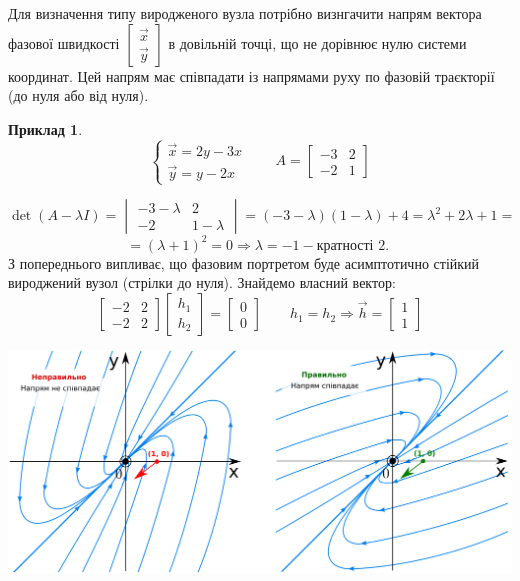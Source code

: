 \documentclass[14pt,a4paper]{scrartcl}
\theoremstyle{definition}
\newtheorem*{example}{Приклад}
\theoremstyle{definition}
\theoremstyle{definition}
\begin{document}
Для визначення типу виродженого вузла потрібно визнгачити напрям вектора фазової швидкості $ \begin{bmatrix}
 \overrightarrow{x} \\
 \overrightarrow{y}
\end{bmatrix}$ в довільній точці, що не дорівнює нулю системи координат. Цей напрям має співпадати із напрямами руху по фазовій траєкторії (до нуля або від нуля).

\begin{example}
    $$
    \begin{cases}
        \overrightarrow{x} = 2y - 3x\\
        \overrightarrow{y} = y - 2x
    \end{cases} \qquad A = \begin{bmatrix}
     -3 & 2 \\
     -2 & 1
    \end{bmatrix}
    $$

    $$
    \det{ \left( A - \lambda I  \right) } = \begin{vmatrix}
      -3 - \lambda & 2 \\
      -2 & 1 - \lambda
    \end{vmatrix} = ( -3 - \lambda ) ( 1 -\lambda) + 4 =  \lambda^2 + 2 \lambda + 1 =
    $$
    $$
    = ( \lambda+ 1) ^2 = 0 \Longrightarrow  \lambda = -1 - \text{кратності 2. }
    $$
З попереднього випливає, що фазовим портретом буде асимптотично стійкий вироджений вузол (стрілки до нуля).
Знайдемо власний вектор:
$$
\begin{bmatrix}
 -2 & 2 \\
 -2 & 2
\end{bmatrix} \begin{bmatrix}
 h_1 \\
 h_2
\end{bmatrix} = \begin{bmatrix}
 0 \\
 0
\end{bmatrix} \qquad h_1 = h_2 \Rightarrow \overrightarrow{h} = \begin{bmatrix}
 1 \\
 1
\end{bmatrix}
$$

\begin{center} \includegraphics[scale=0.3]{assets/lectures_recent-f0de3cfc.png} \end{center}


\end{example}
\end{document}
